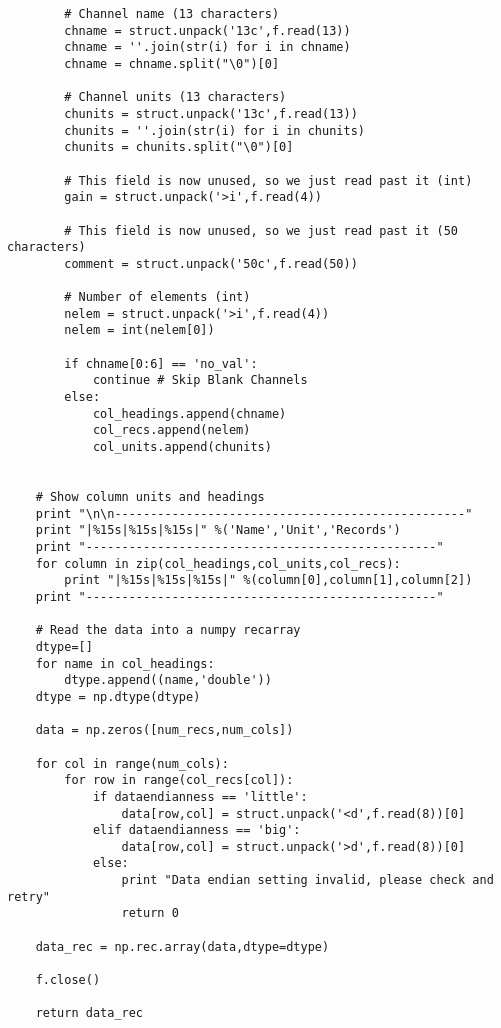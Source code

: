 \documentclass[a4paper,11pt,oneside]{article}
\begin{document}
\begin{lstlisting}
        # Channel name (13 characters)
        chname = struct.unpack('13c',f.read(13))
        chname = ''.join(str(i) for i in chname)
        chname = chname.split("\0")[0] 
        
        # Channel units (13 characters)
        chunits = struct.unpack('13c',f.read(13))
        chunits = ''.join(str(i) for i in chunits)
        chunits = chunits.split("\0")[0]
    
        # This field is now unused, so we just read past it (int)
        gain = struct.unpack('>i',f.read(4))
        
        # This field is now unused, so we just read past it (50 characters)
        comment = struct.unpack('50c',f.read(50))

        # Number of elements (int)
        nelem = struct.unpack('>i',f.read(4))
        nelem = int(nelem[0])
        
        if chname[0:6] == 'no_val':
            continue # Skip Blank Channels
        else:
            col_headings.append(chname)
            col_recs.append(nelem)
            col_units.append(chunits)
    
    
    # Show column units and headings
    print "\n\n-------------------------------------------------"
    print "|%15s|%15s|%15s|" %('Name','Unit','Records')
    print "-------------------------------------------------"
    for column in zip(col_headings,col_units,col_recs):
        print "|%15s|%15s|%15s|" %(column[0],column[1],column[2])
    print "-------------------------------------------------"
    
    # Read the data into a numpy recarray
    dtype=[]
    for name in col_headings:
        dtype.append((name,'double'))
    dtype = np.dtype(dtype)
    
    data = np.zeros([num_recs,num_cols])
    
    for col in range(num_cols):
        for row in range(col_recs[col]):
            if dataendianness == 'little':
                data[row,col] = struct.unpack('<d',f.read(8))[0]
            elif dataendianness == 'big':
                data[row,col] = struct.unpack('>d',f.read(8))[0]
            else:
                print "Data endian setting invalid, please check and retry"
                return 0

    data_rec = np.rec.array(data,dtype=dtype)
    
    f.close()
    
    return data_rec

\end{lstlisting}
\end{document}
